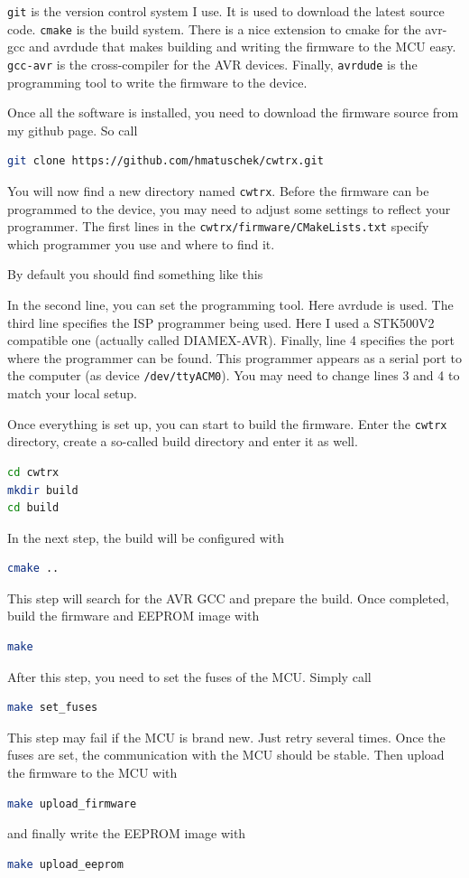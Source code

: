 \documentclass[10pt, a4paper,twoside]{scrartcl}
\begin{document}
\texttt{git} is the version control system I use. It is used to download the latest source code. \texttt{cmake} is the build system. There is a nice extension to cmake for the avr-gcc and avrdude that makes building and writing the firmware to the MCU easy. \texttt{gcc-avr} is the cross-compiler for the AVR devices. Finally, \texttt{avrdude} is the programming tool to write the firmware to the device.

Once all the software is installed, you need to download the firmware source from my github page. So call
\begin{lstlisting}[language=bash]
git clone https://github.com/hmatuschek/cwtrx.git
\end{lstlisting}
You will now find a new directory named \texttt{cwtrx}. Before the firmware can be programmed to the device, you may need to adjust some settings to reflect your programmer. The first lines in the \texttt{cwtrx/\-firmware/\-CMakeLists.txt} specify which programmer you use and where to find it. 

By default you should find something like this

In the second line, you can set the programming tool. Here avrdude is used. The third line specifies the ISP programmer being used. Here I used a STK500V2 compatible one (actually called DIAMEX-AVR). Finally, line 4 specifies the port where the programmer can be found. This programmer appears as a serial port to the computer (as device \texttt{/dev/ttyACM0}). You may need to change lines 3 and 4 to match your local setup.

Once everything is set up, you can start to build the firmware. Enter the \texttt{cwtrx} directory, create a so-called build directory and enter it as well. 
\begin{lstlisting}[language=bash]
cd cwtrx
mkdir build
cd build
\end{lstlisting}

In the next step, the build will be configured with
\begin{lstlisting}[language=bash]
cmake ..
\end{lstlisting}
This step will search for the AVR GCC and prepare the build. Once completed, build the firmware and EEPROM image with
\begin{lstlisting}[language=bash]
make
\end{lstlisting}

After this step, you need to set the fuses of the MCU. Simply call
\begin{lstlisting}[language=bash]
make set_fuses
\end{lstlisting}
This step may fail if the MCU is brand new. Just retry several times. Once the fuses are set, the communication with the MCU should be stable. Then upload the firmware to the MCU with
\begin{lstlisting}[language=bash]
make upload_firmware
\end{lstlisting}
and finally write the EEPROM image with 
\begin{lstlisting}[language=bash]
make upload_eeprom
\end{lstlisting}
\end{document}
